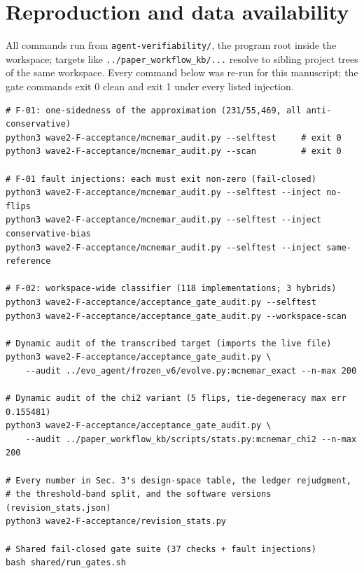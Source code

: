 \documentclass[10pt]{article}
\newcommand{\code}[1]{\texttt{#1}}
\begin{document}



\appendix

\section{Reproduction and data availability}\label{app:repro}

All commands run from \code{agent-verifiability/}, the program root inside
the workspace; targets like \code{../paper\_workflow\_kb/...} resolve to
sibling project trees of the same workspace. Every command below was re-run
for this manuscript; the gate commands exit 0 clean and exit 1 under every
listed injection.

\begin{verbatim}
# F-01: one-sidedness of the approximation (231/55,469, all anti-conservative)
python3 wave2-F-acceptance/mcnemar_audit.py --selftest     # exit 0
python3 wave2-F-acceptance/mcnemar_audit.py --scan         # exit 0

# F-01 fault injections: each must exit non-zero (fail-closed)
python3 wave2-F-acceptance/mcnemar_audit.py --selftest --inject no-flips
python3 wave2-F-acceptance/mcnemar_audit.py --selftest --inject conservative-bias
python3 wave2-F-acceptance/mcnemar_audit.py --selftest --inject same-reference

# F-02: workspace-wide classifier (118 implementations; 3 hybrids)
python3 wave2-F-acceptance/acceptance_gate_audit.py --selftest
python3 wave2-F-acceptance/acceptance_gate_audit.py --workspace-scan

# Dynamic audit of the transcribed target (imports the live file)
python3 wave2-F-acceptance/acceptance_gate_audit.py \
    --audit ../evo_agent/frozen_v6/evolve.py:mcnemar_exact --n-max 200

# Dynamic audit of the chi2 variant (5 flips, tie-degeneracy max err 0.155481)
python3 wave2-F-acceptance/acceptance_gate_audit.py \
    --audit ../paper_workflow_kb/scripts/stats.py:mcnemar_chi2 --n-max 200

# Every number in Sec. 3's design-space table, the ledger rejudgment,
# the threshold-band split, and the software versions (revision_stats.json)
python3 wave2-F-acceptance/revision_stats.py

# Shared fail-closed gate suite (37 checks + fault injections)
bash shared/run_gates.sh
\end{verbatim}
\end{document}
